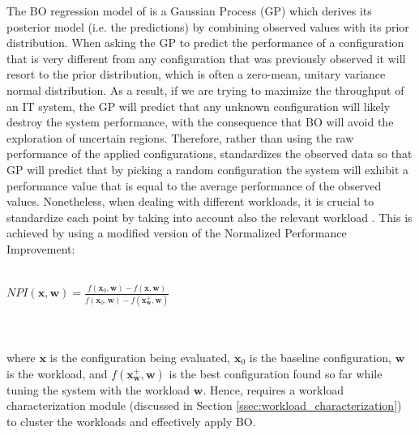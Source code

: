\documentclass[a4paper, 12pt]{article} %
\begin{document}
	The BO regression model of \cite{AkamasCGP} is a Gaussian Process (GP) which derives its posterior model (i.e. the predictions) by combining observed values with its prior distribution. When asking the GP to predict the performance of a configuration that is very different from any configuration that was previously observed it will resort to the prior distribution, which is often a zero-mean, unitary variance normal distribution. As a result, if we are trying to maximize the throughput of an IT system, the GP will predict that any unknown configuration will likely destroy the system performance, with the consequence that BO will avoid the exploration of uncertain regions. Therefore, rather than using the raw performance of the applied configurations, \cite{AkamasCGP} standardizes the observed data so that GP will predict that by picking a random configuration the system will exhibit a performance value that is equal to the average performance of the observed values.
	Nonetheless, when dealing with different workloads, it is crucial to standardize each point by taking into account also the relevant workload \cite{AkamasCGP}. This is achieved by using a modified version of the Normalized Performance Improvement:\\\\
	\centerline{
	$
	NPI(\pmb{x}, \pmb{w}) = \frac{f(\pmb{x}_0, \pmb{w}) - f(\pmb{x}, \pmb{w})}{f(\pmb{x}_0, \pmb{w}) - f(\pmb{x}^+_{\pmb{w}}, \pmb{w})}
	$
	}\\\\
	where $\pmb{x}$ is the configuration being evaluated, $\pmb{x}_0$ is the baseline configuration, $\pmb{w}$ is the workload, and $f(\pmb{x}^+_{\pmb{w}}, \pmb{w})$ is the best configuration found so far while tuning the system with the workload $\pmb{w}$. Hence, \cite{AkamasCGP} requires a workload characterization module (discussed in Section \ref{ssec:workload_characterization}) to cluster the workloads and effectively apply BO.
	
\end{document}

